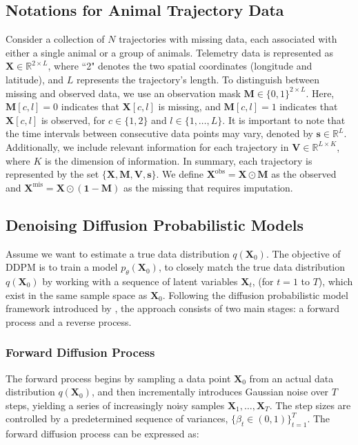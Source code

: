 \documentclass[11pt]{article}
\begin{document}
\subsection{Notations for Animal Trajectory Data}\label{sec: multivariate time series imputation}
Consider a collection of $N$ trajectories with missing data, each associated with either a single animal or a group of animals. Telemetry data is represented as $\bm{X} \in \mathbb{R}^{2 \times L}$, where ``2" denotes the two spatial coordinates (longitude and latitude), and $L$ represents the trajectory's length. To distinguish between missing and observed data, we use an observation mask $\bm{M} \in \{0,1\}^{2 \times L}$. Here, $\bm{M}[c,l]=0$ indicates that $\bm{X}[c,l]$ is missing, and $\bm{M}[c,l]=1$ indicates that $\bm{X}[c,l]$ is observed, for $c\in \{1,2\}$ and $l \in \{1,\ldots,L\}$. It is important to note that the time intervals between consecutive data points may vary, denoted by $\bm{s} \in \mathbb{R}^L$. Additionally, we include relevant information for each trajectory in $\bm{V} \in \mathbb{R}^{L \times K}$, where $K$ is the dimension of information. In summary, each trajectory is represented by the set $\{\bm{X}, \bm{M}, \bm{V}, \bm{s}\}$. We define $\bm{X}^{\mathrm{obs}} = \bm{X} \odot \bm{M}$ as the observed and $\bm{X}^{\mathrm{mis}} = \bm{X} \odot (\bm{1}-\bm{M})$ as the missing that requires imputation. 


\subsection{Denoising Diffusion Probabilistic Models}\label{sec: ddpm}
Assume we want to estimate a true data distribution $q(\bm{X}_0)$. The objective of DDPM is to train a model $p_{\theta}(\bm{X}_0)$, to closely match the true data distribution $q(\bm{X}_0)$ by working with a sequence of latent variables $\bm{X}_t$, (for $t=1$ to $T$), which exist in the same sample space as $\bm{X}_0$. Following the diffusion probabilistic model framework introduced by \citet{ho2020denoising}, the approach consists of two main stages: a forward process and a reverse process.
\subsubsection*{Forward Diffusion Process}
The forward process begins by sampling a data point $\bm{X}_0$ from an actual data distribution $q(\bm{X}_0)$, and then incrementally introduces Gaussian noise over $T$ steps, yielding a series of increasingly noisy samples $\bm{X}_1,\ldots,\bm{X}_T$. The step sizes are controlled by a predetermined sequence of variances, $\{\beta_t\in(0,1)\}_{t=1}^T$. The forward diffusion process can be expressed as:
\end{document}
